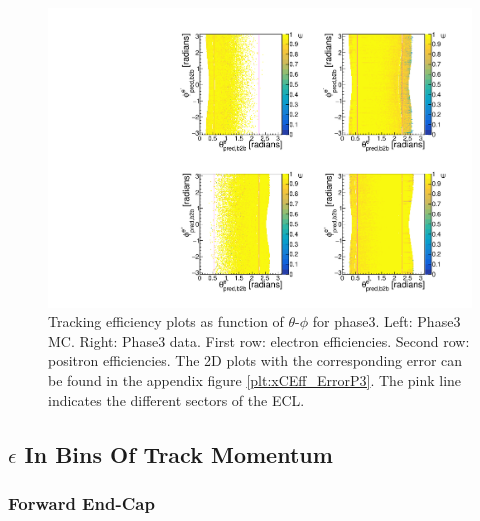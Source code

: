 \documentclass[a4paper,11pt,twosided,final,german,openbib,pdftex,listof=totoc,bibliography=totoc]{scrbook}
\begin{document}
\begin{figure}[!htbp]
	\centering
	\includegraphics[width=\textwidth]{Plots/master3/xCEffTP_MCDataP3.pdf}
	\caption[$\theta$-$\phi$ Efficiency Plots Phase3]{Tracking efficiency plots as function of $\theta$-$\phi$ for phase3. Left: Phase3 MC. Right: Phase3 data. First row: electron efficiencies. Second row: positron efficiencies. The 2D plots with the corresponding error can be found in the appendix figure \ref{plt:xCEff_ErrorP3}. The pink line indicates the different sectors of the ECL.}
	\label{plt:xCEff3}
\end{figure}




\subsection{$\epsilon$ In Bins Of Track Momentum}

\subsubsection{Forward End-Cap}
\end{document}
